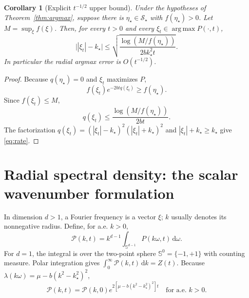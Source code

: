 \documentclass[11pt]{article}
\newtheorem{corollary}[theorem]{Corollary}
\theoremstyle{remark}
\newcommand{\Sstar}{\mathcal S_\star}
\newcommand{\abs}[1]{\left\lvert#1\right\rvert}
\newcommand{\dd}{\,\mathrm d}
\DeclareMathOperator*{\argmax}{arg\,max}
\begin{document}
\begin{corollary}[Explicit $t^{-1/2}$ upper bound]\label{cor:rate}
Under the hypotheses of Theorem~\ref{thm:argmax}, suppose there is
$\eta_\star\in\Sstar$ with $f(\eta_\star)>0$.
Let $M=\sup_\xi f(\xi)$. Then, for every $t>0$ and every
$\xi_t\in\argmax P(\cdot,t)$,
\begin{equation}\label{eq:rate}
 \boxed{\displaystyle
 \bigl\lvert\abs{\xi_t}-k_\star\bigr\rvert
 \le\sqrt{\frac{\log(M/f(\eta_\star))}
 {2bk_\star^2t}}.}
\end{equation}
In particular the radial argmax error is $O(t^{-1/2})$.
\end{corollary}
\begin{proof}
Because $q(\eta_\star)=0$ and $\xi_t$ maximizes $P$,
\[
 f(\xi_t)e^{-2btq(\xi_t)}
 \ge f(\eta_\star).
\]
Since $f(\xi_t)\le M$,
\[
 q(\xi_t)\le\frac{\log(M/f(\eta_\star))}{2bt}.
\]
The factorization
$q(\xi_t)=(\abs{\xi_t}-k_\star)^2(\abs{\xi_t}+k_\star)^2$
and $\abs{\xi_t}+k_\star\ge k_\star$ give \eqref{eq:rate}.
\end{proof}

\section{Radial spectral density: the scalar wavenumber formulation}
In dimension $d>1$, a Fourier frequency is a vector $\xi$;
$k$ usually denotes its nonnegative radius. Define, for a.e. $k>0$,
\begin{equation}\label{eq:radial}
 \mathscr P(k,t)
 =k^{d-1}\int_{\mathbb S^{d-1}}P(k\omega,t)
 \dd\omega.
\end{equation}
For $d=1$, the integral is over the two-point sphere
$\mathbb S^0=\{-1,+1\}$ with counting measure.
Polar integration gives
$\int_0^\infty\mathscr P(k,t)\dd k=Z(t)$.
Because $\lambda(k\omega)=\mu-b(k^2-k_\star^2)^2$,
\begin{equation}\label{eq:radial-power}
 \boxed{\displaystyle
 \mathscr P(k,t)=\mathscr P(k,0)
 e^{2[\mu-b(k^2-k_\star^2)^2]t}}
 \quad\text{for a.e. }k>0.
\end{equation}
\end{document}
